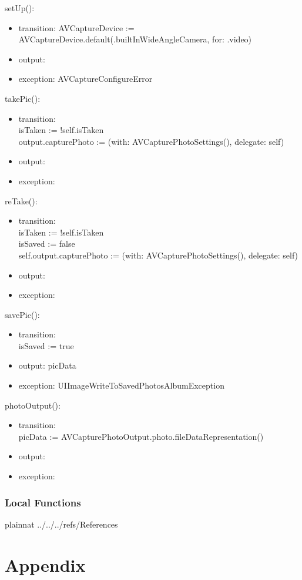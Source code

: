 \documentclass[12pt, titlepage]{article}
\begin{document}
\noindent setUp():
\begin{itemize}
\item transition: AVCaptureDevice := AVCaptureDevice.default(.builtInWideAngleCamera, for: .video) 
\item output: 
\item exception: AVCaptureConfigureError
\end{itemize}

\noindent takePic():
\begin{itemize}
\item transition: \\  
isTaken := !self.isTaken\\
output.capturePhoto := (with: AVCapturePhotoSettings(), delegate: self)
\item output: 
\item exception:
\end{itemize}

\noindent reTake():
\begin{itemize}
\item transition: \\  
isTaken := !self.isTaken\\
isSaved := false\\
self.output.capturePhoto := (with: AVCapturePhotoSettings(), delegate: self)
\item output: 
\item exception:
\end{itemize}

\noindent savePic():
\begin{itemize}
\item transition: \\  
isSaved := true\\
\item output: picData
\item exception: UIImageWriteToSavedPhotosAlbumException
\end{itemize}

\noindent photoOutput():
\begin{itemize}
\item transition: \\  
picData := AVCapturePhotoOutput.photo.fileDataRepresentation()
\item output: 
\item exception:
\end{itemize}

\subsubsection{Local Functions}
 {plainnat}
 {../../../refs/References}

\newpage

\section{Appendix} \label{Appendix} 
\end{document}
